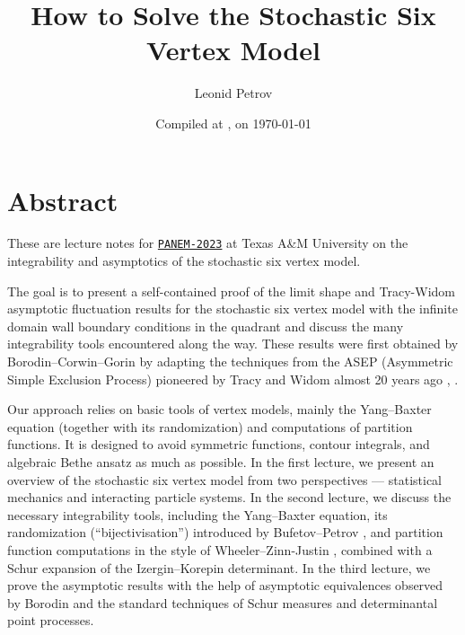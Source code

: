 \documentclass[letterpaper,11pt,oneside,reqno]{article}
\numberwithin{equation}{section}
\theoremstyle{definition}
\theoremstyle{remark}
\begin{document}
\title{How to Solve the Stochastic Six Vertex Model}


\author{Leonid Petrov}

\date{Compiled at \currenttime{}, on \today}

\setcounter{tocdepth}{4}

\maketitle


\section*{Abstract}

These are lecture notes for \href{https://www.math.tamu.edu/conferences/functional_analysis/PANEM.html}{\texttt{PANEM-2023}} at Texas A{}\&M University on the integrability and asymptotics of the stochastic six vertex model.

\medskip

The goal is to present a self-contained proof of the limit shape and Tracy-Widom asymptotic fluctuation results for the stochastic six vertex model with the infinite domain wall boundary conditions in the quadrant and discuss the many integrability tools encountered along the way. These results were first obtained by Borodin--Corwin--Gorin \cite{BCG6V} by adapting the techniques from the ASEP (Asymmetric Simple Exclusion Process) pioneered by Tracy and Widom almost 20 years ago \cite{TW_ASEP1}, \cite{TW_ASEP2}.

Our approach relies on basic tools of vertex models, mainly the Yang--Baxter equation (together with its randomization) and computations of partition functions. It is designed to avoid symmetric functions, contour integrals, and algebraic Bethe ansatz as much as possible. In the first lecture, we present an overview of the stochastic six vertex model from two perspectives --- statistical mechanics and interacting particle systems. In the second lecture, we discuss the necessary integrability tools, including the Yang--Baxter equation, its randomization (``bijectivisation'') introduced by Bufetov--Petrov \cite{BufetovPetrovYB2017}, and partition function computations in the style of Wheeler--Zinn-Justin \cite{wheeler2015refined}, combined with a Schur expansion of the Izergin--Korepin determinant. In the third lecture, we prove the asymptotic results with the help of asymptotic equivalences observed by Borodin \cite{borodin2016stochastic_MM} and the standard techniques of Schur measures and determinantal point processes. 
\end{document}
